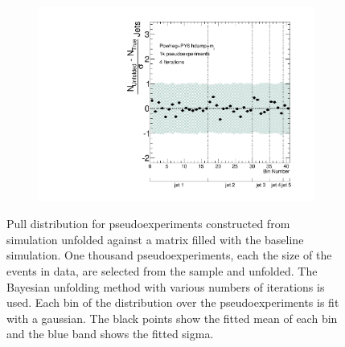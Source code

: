 \begin{figure}
\begin{subfigure}[]{0.5\textwidth}
\end{subfigure}
~
\begin{subfigure}[]{0.5\textwidth}
\includegraphics[width=\textwidth]{fig/Stress/110404atlfast/Pull4Iterations.pdf}
\end{subfigure}
\caption{Pull distribution for pseudoexperiments constructed from \newline \hdamp~ simulation unfolded against a matrix filled with the baseline simulation. One thousand pseudoexperiments, each the size of the events in data, are selected from the sample and unfolded. The Bayesian unfolding method with various numbers of iterations is used. Each bin of the distribution over the pseudoexperiments is fit with a gaussian. The black points show the fitted mean of each bin and the blue band shows the fitted sigma.}
\label{fig:hdamppull}
\end{figure}

